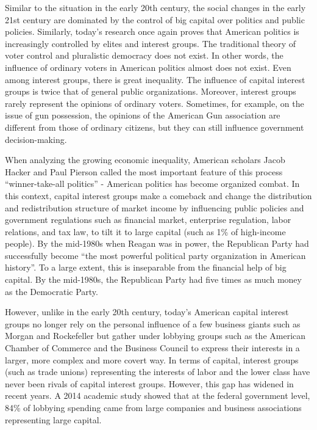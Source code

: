 \documentclass[11pt]{article}
\begin{document}
Similar to the situation in the early 20th century, the social changes in the early 21st century are dominated by the control of big capital over politics and public policies. Similarly, today's research once again proves that American politics is increasingly controlled by elites and interest groups. The traditional theory of voter control and pluralistic democracy does not exist. In other words, the influence of ordinary voters in American politics almost does not exist. Even among interest groups, there is great inequality. The influence of capital interest groups is twice that of general public organizations. Moreover, interest groups rarely represent the opinions of ordinary voters. Sometimes, for example, on the issue of gun possession, the opinions of the American Gun association are different from those of ordinary citizens, but they can still influence government decision-making.

When analyzing the growing economic inequality, American scholars Jacob Hacker and Paul Pierson called the most important feature of this process “winner-take-all politics” - American politics has become organized combat. In this context, capital interest groups make a comeback and change the distribution and redistribution structure of market income by influencing public policies and government regulations such as financial market, enterprise regulation, labor relations, and tax law, to tilt it to large capital (such as 1\% of high-income people). By the mid-1980s when Reagan was in power, the Republican Party had successfully become “the most powerful political party organization in American history”. To a large extent, this is inseparable from the financial help of big capital. By the mid-1980s, the Republican Party had five times as much money as the Democratic Party.

However, unlike in the early 20th century, today's American capital interest groups no longer rely on the personal influence of a few business giants such as Morgan and Rockefeller but gather under lobbying groups such as the American Chamber of Commerce and the Business Council to express their interests in a larger, more complex and more covert way. In terms of capital, interest groups (such as trade unions) representing the interests of labor and the lower class have never been rivals of capital interest groups. However, this gap has widened in recent years. A 2014 academic study showed that at the federal government level, 84\% of lobbying spending came from large companies and business associations representing large capital.
\end{document}
